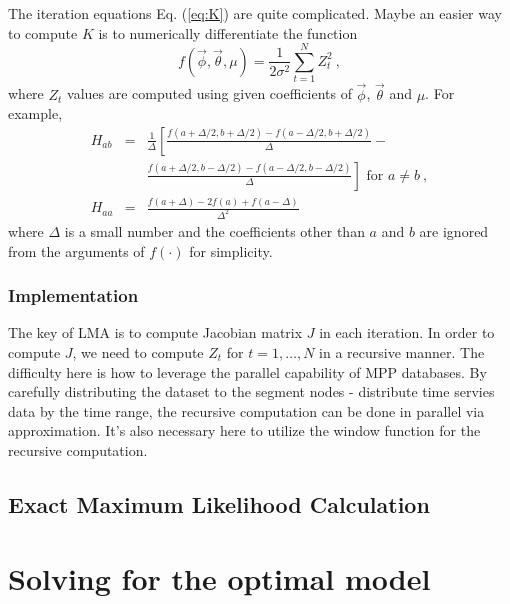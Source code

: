 The iteration equations Eq. (\ref{eq:K}) are quite complicated. Maybe
an easier way to compute $K$ is to numerically differentiate the
function
\begin{equation}
f(\vec{\phi},\vec{\theta},\mu) = \frac{1}{2\sigma^2}\sum_{t=1}^NZ_t^2\ ,
\end{equation}
where $Z_t$ values are computed using given coefficients of
$\vec{\phi}$, $\vec{\theta}$ and $\mu$.
For example,
\begin{eqnarray}
H_{ab} &=&
\frac{1}{\Delta}\left[\frac{f(a+\Delta/2,b+\Delta/2)-f(a-\Delta/2,b+\Delta/2)}{\Delta}
- \right. \nonumber\\
& & \left. \frac{f(a+\Delta/2,b-\Delta/2) - f(a-\Delta/2,b-\Delta/2)}{\Delta}\right] \mbox{ for } a\neq b \
, \\
H_{aa} &=& \frac{f(a+\Delta) - 2f(a) + f(a-\Delta)}{\Delta^2}
\end{eqnarray}
where $\Delta$ is a small number and the coefficients other than $a$
and $b$ are ignored from the arguments of $f(\cdot)$ for simplicity. 


\subsubsection{Implementation}
The key of LMA is to compute Jacobian matrix $J$ in each iteration. In order to compute $J$, we need to compute $Z_t$ for $t=1,\dots,N$ in a recursive manner. The difficulty here is how to leverage the parallel capability of MPP databases. By carefully distributing the dataset to the segment nodes - distribute time servies data by the time range,  the recursive computation can be done in parallel via approximation. It's also necessary here to utilize the window function for the recursive computation.

\subsection{Exact Maximum Likelihood Calculation}



\section{Solving for the optimal model}\label{sec:model_opt}

